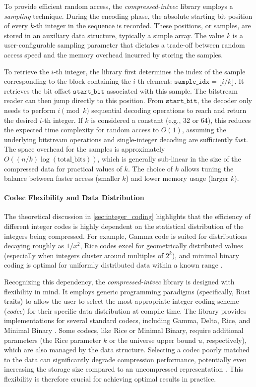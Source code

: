 To provide efficient random access, the \emph{compressed-intvec} library employs a \emph{sampling} technique. During the encoding phase, the absolute starting bit position of every $k$-th integer in the sequence is recorded. These positions, or samples, are stored in an auxiliary data structure, typically a simple array. The value $k$ is a user-configurable sampling parameter that dictates a trade-off between random access speed and the memory overhead incurred by storing the samples.

To retrieve the $i$-th integer, the library first determines the index of the sample corresponding to the block containing the $i$-th element: $\texttt{sample\_idx} = \lfloor i / k \rfloor$. It retrieves the bit offset $\texttt{start\_bit}$ associated with this sample. The bitstream reader can then jump directly to this position. From $\texttt{start\_bit}$, the decoder only needs to perform $i \pmod k$ sequential decoding operations to reach and return the desired $i$-th integer. If $k$ is considered a constant (e.g., 32 or 64), this reduces the expected time complexity for random access to $O(1)$, assuming the underlying bitstream operations and single-integer decoding are sufficiently fast. The space overhead for the samples is approximately $O((n/k) \log(\text{total\_bits}))$, which is generally sub-linear in the size of the compressed data for practical values of $k$. The choice of $k$ allows tuning the balance between faster access (smaller $k$) and lower memory usage (larger $k$).

\paragraph{Codec Flexibility and Data Distribution}
The theoretical discussion in \autoref{sec:integer_coding} highlights that the efficiency of different integer codes is highly dependent on the statistical distribution of the integers being compressed. For example, Gamma code is suited for distributions decaying roughly as $1/x^2$, Rice codes excel for geometrically distributed values (especially when integers cluster around multiples of $2^k$), and minimal binary coding is optimal for uniformly distributed data within a known range \cite{ferragina2023pearls}.

Recognizing this dependency, the \emph{compressed-intvec} library is designed with flexibility in mind. It employs generic programming paradigms (specifically, Rust traits) to allow the user to select the most appropriate integer coding scheme (\emph{codec}) for their specific data distribution at compile time. The library provides implementations for several standard codecs, including Gamma, Delta, Rice, and Minimal Binary \cite{compressed-intvec}. Some codecs, like Rice or Minimal Binary, require additional parameters (the Rice parameter $k$ or the universe upper bound $u$, respectively), which are also managed by the data structure. Selecting a codec poorly matched to the data can significantly degrade compression performance, potentially even increasing the storage size compared to an uncompressed representation \cite{compressed-intvec}. This flexibility is therefore crucial for achieving optimal results in practice.
